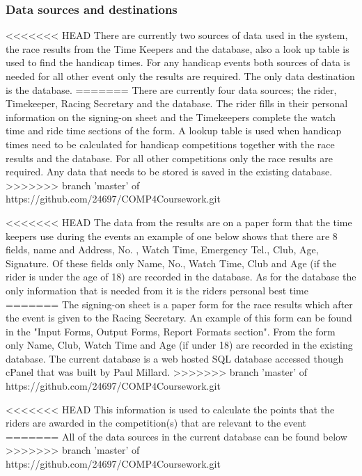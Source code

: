 \subsubsection{Data sources and destinations}
<<<<<<< HEAD
There are currently two sources of data used in the system, the race results from the Time Keepers and the database, also a look up table is used to find the handicap times. For any handicap events both sources of data is needed for all other event only the results are required. The only data destination is the database.
=======
There are currently four data sources; the rider, Timekeeper, Racing Secretary and the database. The rider fills in their personal information on the signing-on sheet and the Timekeepers complete the watch time and ride time sections of the form. A lookup table is used when handicap times need to be calculated for handicap competitions together with the race results and the database. For all other competitions only the race results are required. Any data that needs to be stored is saved in the existing database.
>>>>>>> branch 'master' of https://github.com/24697/COMP4Coursework.git

<<<<<<< HEAD
The data from the results are on a paper form that the time keepers use during the events an example of one below shows that there are 8 fields, name and Address, No. , Watch Time, Emergency Tel., Club, Age, Signature. Of these fields only Name, No., Watch Time, Club and Age (if the rider is under the age of 18) are recorded in the database. As for the database the only information that is needed from it is the riders personal best time
=======
The signing-on sheet is a paper form for the race results which after the event is given to the Racing Secretary. An example of this form can be found  in the "Input Forms, Output Forms, Report Formats section". From the form only Name, Club, Watch Time and Age (if under 18) are recorded in the existing database. The current database is a web hosted SQL database accessed though cPanel that was built by Paul Millard. 
>>>>>>> branch 'master' of https://github.com/24697/COMP4Coursework.git

<<<<<<< HEAD
This information is used to calculate the points that the riders are awarded in the competition(s) that are relevant to the event
=======
All of the data sources in the current database can be found below
>>>>>>> branch 'master' of https://github.com/24697/COMP4Coursework.git

